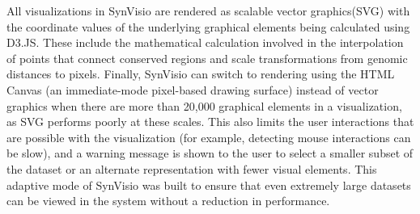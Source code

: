 All visualizations in SynVisio are rendered as scalable vector graphics(SVG) with the coordinate values of the underlying graphical elements being calculated using D3.JS. These include the mathematical calculation involved in the interpolation of points that connect conserved regions and scale transformations from genomic distances to pixels. Finally, SynVisio can switch to rendering using the HTML Canvas (an immediate-mode pixel-based drawing surface) instead of vector graphics when there are more than 20,000 graphical elements in a visualization, as SVG performs poorly at these scales. This also limits the user interactions that are possible with the visualization (for example, detecting mouse interactions can be slow), and a warning message is shown to the user to select a smaller subset of the dataset or an alternate representation with fewer visual elements. This adaptive mode of SynVisio was built to ensure that even extremely large datasets can be viewed in the system without a reduction in performance.

